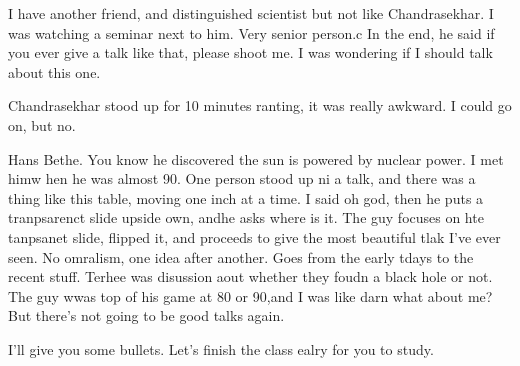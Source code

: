 I have another friend,
and distinguished scientist but not like Chandrasekhar.
I was watching a seminar next to him.
Very senior person.c
In the end,
he said if you ever give a talk like that,
please shoot me.
I was wondering if I should talk about this one.

Chandrasekhar stood up for 10 minutes ranting,
it was really awkward.
I could go on, but no.

Hans Bethe.
You know he discovered the sun is powered by nuclear power.
I met himw hen he was almost 90.
One person stood up ni a talk,
and there was a thing like this table,
moving one inch at a time.
I said oh god,
then he puts a tranpsarenct slide upside own,
andhe asks where is it.
The guy focuses on hte tanpsanet slide,
flipped it,
and proceeds to give the most beautiful tlak I've ever seen.
No omralism,
one idea after another.
Goes from the early tdays to the recent stuff.
Terhee was disussion aout whether they foudn a black hole or not.
The guy wwas top of his game at 80 or 90,and I was like darn what about me?
But there's not going to be good talks again.

I'll give you some bullets.
Let's finish the class ealry for you to study.
